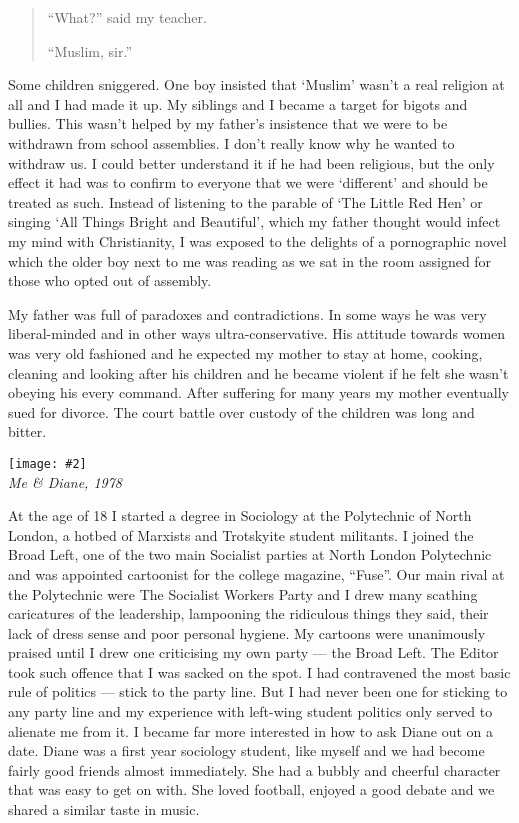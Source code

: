 \documentclass[12pt]{memoir}
\def\–{-\hskip0pt}
\newcommand{\img}[3]{\begin{center}%
\texttt{[image: \#2]}\\{\small\em#3}%
\end{center}}
\begin{document}
\begin{quote}
“What?” said my teacher.

“Muslim, sir.”
\end{quote}

Some children sniggered.
One boy insisted that ‘Muslim’ wasn’t a real religion at all
and I had made it up.
My siblings and I became a target for bigots and bullies.
This wasn’t helped by my father’s insistence
that we were to be withdrawn from school assemblies.
I don’t really know why he wanted to withdraw us.
I could better understand it if he had been religious,
but the only effect it had was to confirm to everyone
that we were ‘different’ and should be treated as such.
Instead of listening to the parable of ‘The Little Red Hen’
or singing ‘All Things Bright and Beautiful’,
which my father thought would infect my mind with Christianity,
I was exposed to the delights of a pornographic novel
which the older boy next to me was reading
as we sat in the room assigned for those who opted out of assembly.

My father was full of paradoxes and contradictions.
In some ways he was very liberal-minded and in other ways ultra\–conservative.
His attitude towards women was very old fashioned
and he expected my mother to stay at home, cooking,
cleaning and looking after his children
and he became violent if he felt she wasn’t obeying his every command.
After suffering for many years my mother eventually sued for divorce.
The court battle over custody of the children was long and bitter.

\img{scale=0.3}{Hassan_and_Diane.jpg}
{Me \& Diane, 1978}

At the age of 18 I started a degree in Sociology
at the Polytechnic of North London,
a hotbed of Marxists and Trotskyite student militants.
I joined the Broad Left, one of the two main Socialist parties
at North London Polytechnic and was appointed cartoonist
for the college magazine, “Fuse”.
Our main rival at the Polytechnic were The Socialist Workers Party
and I drew many scathing caricatures of the leadership,
lampooning the ridiculous things they said,
their lack of dress sense and poor personal hygiene.
My cartoons were unanimously praised until I drew one
criticising my own party — the Broad Left.
The Editor took such offence that I was sacked on the spot.
I had contravened the most basic rule of politics — stick to the party line.
But I had never been one for sticking to any party line
and my experience with left-wing student politics
only served to alienate me from it.
I became far more interested in how to ask Diane out on a date.
Diane was a first year sociology student,
like myself and we had become fairly good friends almost immediately.
She had a bubbly and cheerful character that was easy to get on with.
She loved football, enjoyed a good debate
and we shared a similar taste in music.
\end{document}
